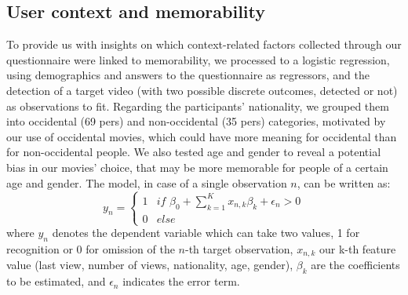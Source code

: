 \documentclass[sigconf]{acmart}
\begin{document}
\subsection{User context and memorability}%
To provide us with insights on which context-related factors collected through our questionnaire were linked to memorability, we processed to a logistic regression, using demographics and answers to the questionnaire as regressors, and the detection of a target video (with two possible discrete outcomes, detected or not) as observations to fit.
Regarding the participants' nationality, we grouped them into occidental (69 pers) and non-occidental (35 pers) categories, motivated by our use of occidental movies, which could have more meaning for occidental than for non-occidental people.
We also tested age and gender to reveal a potential bias in our movies' choice, that may be more memorable for people of a certain age and gender.
The model, in case of a single observation $n$, can be written as:
\begin{equation}
	y_{n}=
	\begin{cases}
	1 & \textit{if } \beta_0 + \sum\limits_{k=1}^K x_{n,k} \beta_k+\epsilon_n>0 \\
	0 & else
	\end{cases}
\end{equation}
where $y_{n}$ denotes the dependent variable which can take two values, 1 for recognition or 0 for omission of the $n$-th target observation, $x_{n,k}$ our k-th feature value (last view, number of views, nationality, age, gender), $\beta_{k}$ are the coefficients to be estimated, and $\epsilon_{n}$ indicates the error term.
\end{document}
